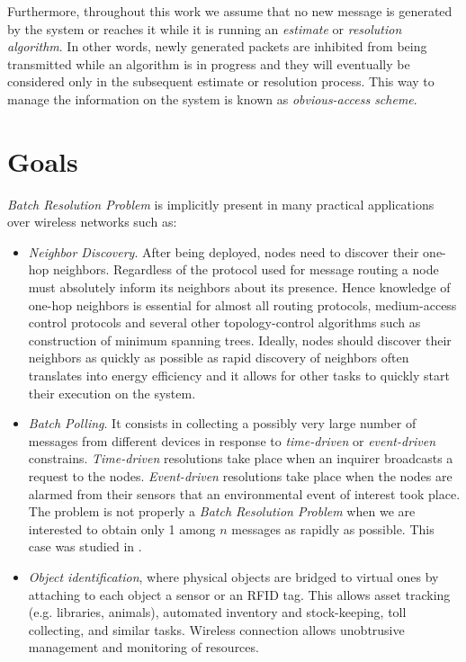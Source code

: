 \documentclass[12pt,a4paper]{report}
\newcommand{\rev}[1]{\textcolor{Cerulean}{#1}}
\begin{document}
\rev{
Furthermore, throughout this work we assume that no new message is generated by the system or reaches it while it is running an \emph{estimate} or \emph{resolution algorithm}. In other words, newly generated packets are inhibited from being transmitted while an algorithm is in progress and they will eventually be considered only in the subsequent estimate or resolution process. This way to manage the information on the system is known as \emph{obvious-access scheme}.\\}

\section{Goals}
\emph{Batch Resolution Problem} is implicitly present in many practical applications over wireless networks such as:
\begin{itemize}
\item \emph{Neighbor Discovery}. After being deployed, nodes need to discover their one-hop neighbors. Regardless of the protocol used for message routing a node must absolutely inform its neighbors about its presence.
Hence knowledge of one-hop neighbors is essential for almost all routing protocols, medium-access control protocols and several other topology-control algorithms such as construction of minimum spanning trees.
Ideally, nodes should discover their neighbors as quickly as possible as rapid discovery of neighbors often translates into energy efficiency and it allows for other tasks to quickly start their execution on the system.
\item \emph{Batch Polling}. It consists in collecting a possibly very large number of messages from different devices in response to \emph{time-driven} or \emph{event-driven} constrains. \emph{Time-driven} resolutions take place when an inquirer broadcasts a request to the nodes. \emph{Event-driven} resolutions take place when the nodes are alarmed from their sensors that an environmental event of interest took place. The problem is not properly a \emph{Batch Resolution Problem} when we are interested to obtain only 1 among $n$ messages as rapidly as possible. This case was studied in \cite{sift}.
\item \emph{Object identification}, where physical objects are bridged to virtual ones by attaching to each object a sensor or an RFID tag. This allows asset tracking (e.g. libraries, animals), automated inventory and stock-keeping, toll collecting, and similar tasks. Wireless connection allows unobtrusive management and monitoring of resources.
\end{itemize}
\end{document}
